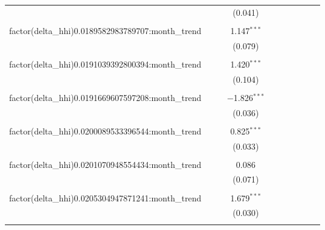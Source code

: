 \begin{table}[H]
{\begin{tabular}{@{\extracolsep{5pt}}lccccccccc}
   &  &  & (0.041) &  &  &  &  &  &  \\  

   & & & & & & & & & \\  

  factor(delta\_hhi)0.0189582983789707:month\_trend &  &  & 1.147$^{***}$ &  &  &  &  &  &  \\  

   &  &  & (0.079) &  &  &  &  &  &  \\  

   & & & & & & & & & \\  

  factor(delta\_hhi)0.0191039392800394:month\_trend &  &  & 1.420$^{***}$ &  &  &  &  &  &  \\  

   &  &  & (0.104) &  &  &  &  &  &  \\  

   & & & & & & & & & \\  

  factor(delta\_hhi)0.0191669607597208:month\_trend &  &  & $-$1.826$^{***}$ &  &  &  &  &  &  \\  

   &  &  & (0.036) &  &  &  &  &  &  \\  

   & & & & & & & & & \\  

  factor(delta\_hhi)0.0200089533396544:month\_trend &  &  & 0.825$^{***}$ &  &  &  &  &  &  \\  

   &  &  & (0.033) &  &  &  &  &  &  \\  

   & & & & & & & & & \\  

  factor(delta\_hhi)0.0201070948554434:month\_trend &  &  & 0.086 &  &  &  &  &  &  \\  

   &  &  & (0.071) &  &  &  &  &  &  \\  

   & & & & & & & & & \\  

  factor(delta\_hhi)0.0205304947871241:month\_trend &  &  & 1.679$^{***}$ &  &  &  &  &  &  \\  

   &  &  & (0.030) &  &  &  &  &  &  \\  

   & & & & & & & & & \\  


\end{tabular}}
\end{table}
